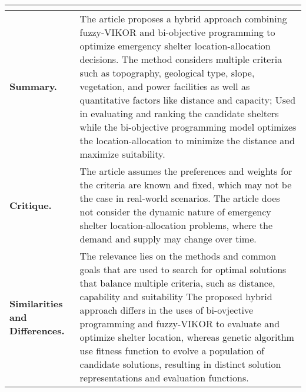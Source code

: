 \begin{longtable}{|L{.2\linewidth}|L{.74\linewidth}|}
	\hline
	\\ \hline
	\textbf{Summary.} & The article proposes a hybrid approach combining fuzzy-VIKOR and bi-objective programming to optimize emergency shelter location-allocation decisions. The method considers multiple criteria such as topography, geological type, slope, vegetation, and power facilities as well as quantitative factors like distance and capacity; Used in evaluating and ranking the candidate shelters while the bi-objective programming model optimizes the location-allocation to minimize the distance and maximize suitability.\\ \hline
	\textbf{Critique.} & The article assumes the preferences and weights for the criteria are known and fixed, which may not be the case in real-world scenarios. The article does not consider the dynamic nature of emergency shelter location-allocation problems, where the demand and supply may change over time.\\ \hline
	\textbf{Similarities and Differences.} & The relevance lies on the methods and common goals that are used to search for optimal solutions that balance multiple criteria, such as distance, capability and suitability	The proposed hybrid approach differs in the uses of bi-ovjective programming and fuzzy-VIKOR to evaluate and optimize shelter location, whereas genetic algorithm use fitness function to evolve a population of candidate solutions, resulting in distinct solution representations and evaluation functions.\\ \hline
\end{longtable}

